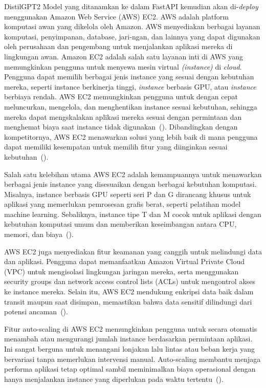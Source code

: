 DistilGPT2 Model yang ditanamkan ke dalam FastAPI kemudian 
akan di-\emph{deploy} menggunakan Amazon Web Service (AWS) EC2. 
AWS adalah platform komputasi awan yang dikelola oleh Amazon. 
AWS menyediakan berbagai layanan komputasi, penyimpanan, database, 
jari-ngan, dan lainnya yang dapat digunakan oleh perusahaan dan 
pengembang untuk menjalankan aplikasi mereka di lingkungan awan. 
Amazon EC2 adalah salah satu layanan inti di AWS yang memungkinkan 
pengguna untuk menyewa mesin virtual \emph{(instance)} di \emph{cloud}. 
Pengguna dapat memilih berbagai jenis instance yang sesuai dengan 
kebutuhan mereka, seperti instance berkinerja tinggi, \emph{instance} 
berbasis GPU, atau \emph{instance} berbiaya rendah. AWS EC2 
memungkinkan pengguna untuk dengan cepat meluncurkan, mengelola, 
dan menghentikan instance sesuai kebutuhan, sehingga mereka dapat 
mengskalakan aplikasi mereka sesuai dengan permintaan dan menghemat 
biaya saat instance tidak digunakan~(\cite{vohra2016}). Dibandingkan 
dengan kompetitornya, AWS EC2 menawarkan solusi yang lebih baik di 
mana pengguna dapat memiliki kesempatan untuk memilih fitur yang 
diinginkan sesuai kebutuhan~(\cite{kumar2021}).

Salah satu kelebihan utama AWS EC2 adalah kemampuannya untuk menawarkan berbagai jenis instance yang disesuaikan dengan berbagai kebutuhan komputasi. Misalnya, instance berbasis GPU seperti seri P dan G dirancang khusus untuk aplikasi yang memerlukan pemrosesan grafis berat, seperti pelatihan model machine learning. Sebaliknya, instance tipe T dan M cocok untuk aplikasi dengan kebutuhan komputasi umum dan memberikan keseimbangan antara CPU, memori, dan biaya~(\cite{aws2022}).

AWS EC2 juga menyediakan fitur keamanan yang canggih untuk melindungi data dan aplikasi. Pengguna dapat memanfaatkan Amazon Virtual Private Cloud (VPC) untuk mengisolasi lingkungan jaringan mereka, serta menggunakan security groups dan network access control lists (ACLs) untuk mengontrol akses ke instance mereka. Selain itu, AWS EC2 mendukung enkripsi data baik dalam transit maupun saat disimpan, memastikan bahwa data sensitif dilindungi dari potensi ancaman~(\cite{sharma2021}).

Fitur auto-scaling di AWS EC2 memungkinkan pengguna untuk secara otomatis menambah atau mengurangi jumlah instance berdasarkan permintaan aplikasi. Ini sangat berguna untuk menangani lonjakan lalu lintas atau beban kerja yang bervariasi tanpa memerlukan intervensi manual. Auto-scaling membantu menjaga performa aplikasi tetap optimal sambil meminimalkan biaya operasional dengan hanya menjalankan instance yang diperlukan pada waktu tertentu~(\cite{tang2021}).

